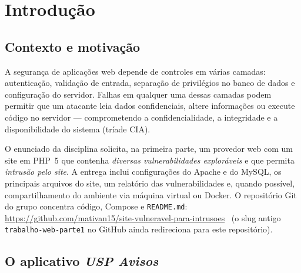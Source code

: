 \begin{abstract}
  Este documento descreve a primeira parte do projeto de Engenharia de Segurança: um ambiente
  containerizado com servidor web Apache, interpretador PHP 5.6.40 e banco MySQL 5.7, hospedando
  um mural interno de avisos fictício (\textit{USP Avisos}: login, publicação, busca e recursos
  auxiliares) com falhas intencionais. O objetivo é permitir
  a demonstração de vulnerabilidades de aplicação web, incluindo intrusão pelo próprio site em PHP,
  conforme o enunciado da disciplina \cite{enunciado}. O ambiente é exclusivamente educativo e não
  deve ser publicado ou operado em produção.
  \end{abstract}
  \section{Introdução}
  
  \subsection{Contexto e motivação}
  
  A segurança de aplicações web depende de controles em várias camadas: autenticação, validação de
  entrada, separação de privilégios no banco de dados e configuração do servidor. Falhas em qualquer
  uma dessas camadas podem permitir que um atacante leia dados confidenciais, altere informações ou
  execute código no servidor --- comprometendo a confidencialidade, a integridade e a disponibilidade
  do sistema (tríade CIA).
  
  O enunciado da disciplina solicita, na primeira parte, um provedor web com um site em PHP~5 que
  contenha \emph{diversas vulnerabilidades exploráveis} e que permita \emph{intrusão pelo site}.
  A entrega inclui configurações do Apache e do MySQL, os principais arquivos do site, um relatório
  das vulnerabilidades e, quando possível, compartilhamento do ambiente via máquina virtual ou Docker.
  O repositório Git do grupo concentra código, Compose e \texttt{README.md}:
  \url{https://github.com/mativan15/site-vulneravel-para-intrusoes}~\cite{repo}
  (o slug antigo \texttt{trabalho-web-parte1} no GitHub ainda redireciona para este repositório).
  
  \subsection{O aplicativo \textit{USP Avisos}}
  \label{sec:usp-avisos}
  
